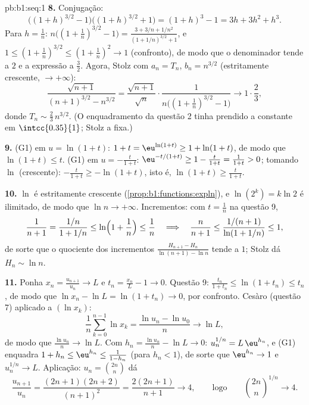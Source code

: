 \begin{solution}{pb:b1:seq:1}
\textbf{8.} Conjugação:
\[
\bigl((1+h)^{3/2} - 1\bigr)\bigl((1+h)^{3/2} + 1\bigr)
= (1+h)^3 - 1 = 3h + 3h^2 + h^3 .
\]
Para $h = \frac1n$: $n\bigl((1 + \frac1n)^{3/2} - 1\bigr) =
\frac{3 + 3/n + 1/n^2}{(1 + 1/n)^{3/2} + 1}$, e $1 \leq (1 +
\frac1n)^{3/2} \leq (1 + \frac1n)^2 \to 1$ (confronto), de modo que o
denominador tende a $2$ e a expressão a $\frac32$. Agora,
Stolz com $a_n = T_n$, $b_n = n^{3/2}$ (estritamente crescente,
$\to +\infty$):
\[
\frac{\sqrt{n+1}}{(n+1)^{3/2} - n^{3/2}}
= \frac{\sqrt{n+1}}{\sqrt n} \cdot
\frac{1}{n\bigl((1 + \frac1n)^{3/2} - 1\bigr)}
\longrightarrow 1 \cdot \frac{2}{3},
\]
donde $T_n \sim \frac23\,n^{3/2}$. (O enquadramento da questão 2
tinha prendido a constante em $\intcc{0.35}{1}$; Stolz a fixa.)

\textbf{9.} (G1) em $u = \ln(1+t)$: $1 + t = \eu^{\ln(1+t)} \geq
1 + \ln(1+t)$, de modo que $\ln(1+t) \leq t$. (G1) em $u =
-\frac{t}{1+t}$: $\eu^{-t/(1+t)} \geq 1 - \frac{t}{1+t} =
\frac{1}{1+t} > 0$; tomando $\ln$ (crescente):
$-\frac{t}{1+t} \geq -\ln(1+t)$, isto é, $\ln(1+t) \geq
\frac{t}{1+t}$.

\textbf{10.} $\ln$ é estritamente crescente
(\cref{prop:b1:functions:expln}), e $\ln(2^k) = k\ln 2$ é
ilimitado, de modo que $\ln n \to +\infty$. Incrementos: com $t =
\frac1n$ na questão 9,
\[
\frac 1{n+1} = \frac{1/n}{1 + 1/n} \leq
\ln\Bigl(1 + \frac1n\Bigr) \leq \frac1n
\quad\Longrightarrow\quad
\frac{n}{n+1} \leq \frac{1/(n+1)}{\ln(1 + 1/n)} \leq 1 ,
\]
de sorte que o quociente dos incrementos $\frac{H_{n+1} - H_n}{\ln(n+1) - \ln
n}$ tende a $1$; Stolz dá $H_n \sim \ln n$.

\textbf{11.} Ponha $x_n = \frac{u_{n+1}}{u_n} \to L$ e $t_n =
\frac{x_n}{L} - 1 \to 0$. Questão 9: $\frac{t_n}{1 + t_n} \leq
\ln(1 + t_n) \leq t_n$, de modo que $\ln x_n - \ln L = \ln(1 + t_n) \to
0$, por confronto. Cesàro (questão 7) aplicado a $(\ln x_k)$:
\[
\frac1n \sum_{k=0}^{n-1} \ln x_k = \frac{\ln u_n - \ln u_0}{n}
\longrightarrow \ln L ,
\]
de modo que $\frac{\ln u_n}{n} \to \ln L$. Com $h_n = \frac{\ln u_n}{n}
- \ln L \to 0$: $u_n^{1/n} = L\,\eu^{h_n}$, e (G1) enquadra
$1 + h_n \leq \eu^{h_n} \leq \frac{1}{1 - h_n}$ (para $h_n < 1$),
de sorte que $\eu^{h_n} \to 1$ e $u_n^{1/n} \to L$. Aplicação: $u_n =
\binom{2n}{n}$ dá
\[
\frac{u_{n+1}}{u_n} = \frac{(2n+1)(2n+2)}{(n+1)^2}
= \frac{2(2n+1)}{n+1} \longrightarrow 4 ,
\qquad\text{logo}\qquad
\binom{2n}{n}^{1/n} \to 4 .
\]


\end{solution}
